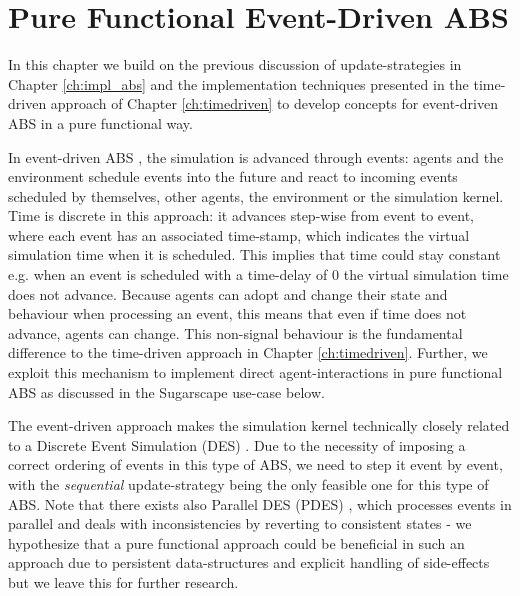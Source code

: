 \chapter{Pure Functional Event-Driven ABS}
\label{ch:eventdriven}

In this chapter we build on the previous discussion of update-strategies in Chapter \ref{ch:impl_abs} and the implementation techniques presented in the time-driven approach of Chapter \ref{ch:timedriven} to develop concepts for event-driven ABS in a pure functional way. 

In event-driven ABS \cite{meyer_event-driven_2014}, the simulation is advanced through events: agents and the environment schedule events into the future and react to incoming events scheduled by themselves, other agents, the environment or the simulation kernel. Time is discrete in this approach: it advances step-wise from event to event, where each event has an associated time-stamp, which indicates the virtual simulation time when it is scheduled. This implies that time could stay constant e.g. when an event is scheduled with a time-delay of 0 the virtual simulation time does not advance. Because agents can adopt and change their state and behaviour when processing an event, this means that even if time does not advance, agents can change. This non-signal behaviour is the fundamental difference to the time-driven approach in Chapter \ref{ch:timedriven}. Further, we exploit this mechanism to implement direct agent-interactions in pure functional ABS as discussed in the Sugarscape use-case below.

The event-driven approach makes the simulation kernel technically closely related to a Discrete Event Simulation (DES) \cite{zeigler_theory_2000}. Due to the necessity of imposing a correct ordering of events in this type of ABS, we need to step it event by event, with the \textit{sequential} update-strategy being the only feasible one for this type of ABS. Note that there exists also Parallel DES (PDES) \cite{fujimoto_parallel_1990}, which processes events in parallel and deals with inconsistencies by reverting to consistent states - we hypothesize that a pure functional approach could be beneficial in such an approach due to persistent data-structures and explicit handling of side-effects but we leave this for further research.

